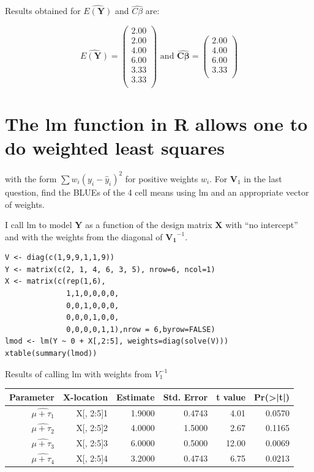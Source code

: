 \documentclass[11pt]{article}
\begin{document}
Results obtained for $\widehat{E(\mathbf{Y})}$ and $\widehat{C\beta}$ are:

\[
\widehat{E(\mathbf{Y})} =
\begin{pmatrix}{}
  2.00 \\ 
  2.00 \\ 
  4.00 \\ 
  6.00 \\ 
  3.33 \\ 
  3.33 \\ 
  \end{pmatrix}\,\,\mathrm{and}\,\,\widehat{\mathbf{C\beta}} =
\begin{pmatrix}{}
  2.00 \\ 
  4.00 \\ 
  6.00 \\ 
  3.33 \\ 
  \end{pmatrix}
\]
\section{The lm function in R allows one to do weighted least squares}
\label{sec-3}

 with the form $\sum w_i(y_i-\hat{y}_i)^2$ for positive weights $w_i$.
 For $\mathbf{V}_1$ in the last question, find the BLUEs of the 4 cell
 means using lm and an appropriate vector of weights.


I call lm to model $\mathbf{Y}$ as a function of the design matrix $\mathbf{X}$ with
``no intercept'' and with the weights from the diagonal of $\mathbf{V_1}^{-1}$.


\begin{verbatim}
V <- diag(c(1,9,9,1,1,9))
Y <- matrix(c(2, 1, 4, 6, 3, 5), nrow=6, ncol=1)
X <- matrix(c(rep(1,6),
              1,1,0,0,0,0,
              0,0,1,0,0,0,
              0,0,0,1,0,0,
              0,0,0,0,1,1),nrow = 6,byrow=FALSE)
lmod <- lm(Y ~ 0 + X[,2:5], weights=diag(solve(V)))
xtable(summary(lmod))
\end{verbatim}

\begin{table}[ht]
\centering
Results of calling lm with weights from $V_1^{-1}$\\
\begin{tabular}{rrrrrr}
  \hline
 Parameter & X-location & Estimate & Std. Error & t value & Pr(>|t|) \\ 
  \hline
$\widehat{\mu + \tau_1}$ & X[, 2:5]1 & 1.9000 & 0.4743 & 4.01 & 0.0570 \\ 
$\widehat{\mu + \tau_2}$ &  X[, 2:5]2 & 4.0000 & 1.5000 & 2.67 & 0.1165 \\ 
$\widehat{\mu + \tau_3}$ &  X[, 2:5]3 & 6.0000 & 0.5000 & 12.00 & 0.0069 \\ 
$\widehat{\mu + \tau_4}$ &  X[, 2:5]4 & 3.2000 & 0.4743 & 6.75 & 0.0213 \\ 
   \hline
\end{tabular}
\end{table}
\end{document}
